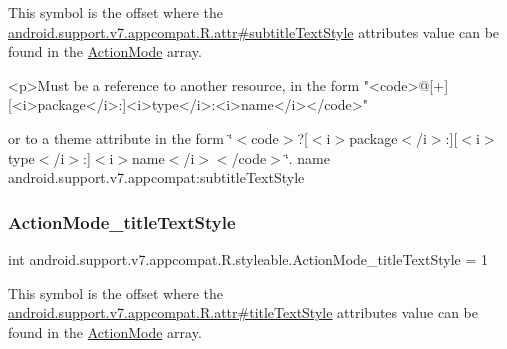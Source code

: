 This symbol is the offset where the \hyperlink{classandroid_1_1support_1_1v7_1_1appcompat_1_1R_1_1attr_a2a9a010f70cdd5dd8a5b63782382f5f7}{android.\+support.\+v7.\+appcompat.\+R.\+attr\#subtitle\+Text\+Style} attribute\textquotesingle{}s value can be found in the \hyperlink{classandroid_1_1support_1_1v7_1_1appcompat_1_1R_1_1styleable_ac4197f1a9a85a8f5973cc5efa358ad9f}{Action\+Mode} array.

\begin{DoxyVerb}      <p>Must be a reference to another resource, in the form "<code>@[+][<i>package</i>:]<i>type</i>:<i>name</i></code>"
\end{DoxyVerb}
 or to a theme attribute in the form \char`\"{}$<$code$>$?\mbox{[}$<$i$>$package$<$/i$>$\+:\mbox{]}\mbox{[}$<$i$>$type$<$/i$>$\+:\mbox{]}$<$i$>$name$<$/i$>$$<$/code$>$\char`\"{}.  name android.\+support.\+v7.\+appcompat\+:subtitle\+Text\+Style \mbox{\label{classandroid_1_1support_1_1v7_1_1appcompat_1_1R_1_1styleable_a7c9fa645d0ba6eaae582d3bb1706309a}} 
\subsubsection{\texorpdfstring{Action\+Mode\+\_\+title\+Text\+Style}{ActionMode\_titleTextStyle}}
{\footnotesize\ttfamily int android.\+support.\+v7.\+appcompat.\+R.\+styleable.\+Action\+Mode\+\_\+title\+Text\+Style = 1\hspace{0.3cm}{\ttfamily [static]}}

This symbol is the offset where the \hyperlink{classandroid_1_1support_1_1v7_1_1appcompat_1_1R_1_1attr_a736fcf06e75745b6eb862450e360d947}{android.\+support.\+v7.\+appcompat.\+R.\+attr\#title\+Text\+Style} attribute\textquotesingle{}s value can be found in the \hyperlink{classandroid_1_1support_1_1v7_1_1appcompat_1_1R_1_1styleable_ac4197f1a9a85a8f5973cc5efa358ad9f}{Action\+Mode} array.

